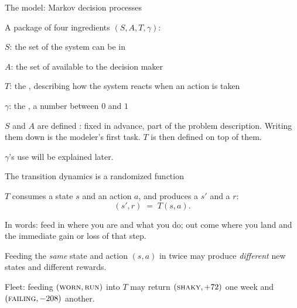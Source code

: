 
\begin{frame}{The model: Markov decision processes}
\begin{lbox}
A package of four ingredients $(S, A, T, \gamma)$:
\begin{bullets}
\item $S$: the set of  the system can be in
\item $A$: the set of  available to the decision maker
\item $T$: the , describing how the system reacts when an action is taken
\item $\gamma$: the , a number between $0$ and $1$
\end{bullets}
\end{lbox}
\pause
\begin{bullets}
\item $S$ and $A$ are defined : fixed in advance, part of the problem description. Writing them down is the modeler's first task. $T$ is then defined on top of them.
\item $\gamma$'s use will be explained later.
\end{bullets}
\end{frame}

\begin{frame}{The transition dynamics is a randomized function}
\begin{bullets}
\item $T$ consumes a state $s$ and an action $a$, and produces a  $s'$ and a  $r$:
\[ (s', r) \;=\; T(s, a). \]
\item In words: feed in where you are and what you do; out come where you land and the immediate gain or loss of that step.
\end{bullets}
\pause
\begin{alertbox}
Feeding the \emph{same} state and action $(s,a)$ in twice may produce \emph{different} new states and different rewards.
\end{alertbox}
\pause
\begin{bullets}
\item Fleet: feeding $(\textsc{worn}, \textsc{run})$ into $T$ may return $(\textsc{shaky}, +72)$ one week and $(\textsc{failing}, -208)$ another.
\end{bullets}
\end{frame}

